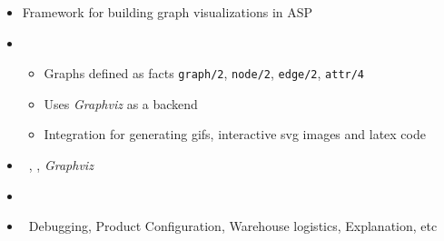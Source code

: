 \begin{frame}{\clingraph}
  \begin{itemize}
    \item {} Framework for building graph visualizations in ASP
    \item {} 
      \begin{itemize}
      \item Graphs defined as facts \texttt{graph/2}, \texttt{node/2}, \texttt{edge/2}, \texttt{attr/4}
      \item Uses \textit{Graphviz} as a backend
      \item Integration for generating gifs, interactive svg images and latex code
      \end{itemize}
    \item {} \  \clingo, \clorm, \textit{Graphviz}
    \item {} \ \cite{hasascst22a}
    \item {} \ Debugging, Product Configuration, Warehouse logistics, Explanation, etc
  \end{itemize}
\end{frame}
%
